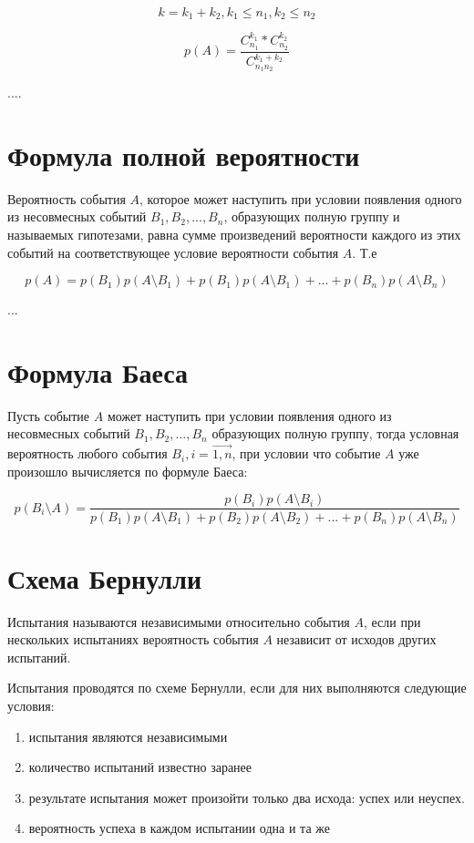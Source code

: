 \documentclass[a4paper]{article}
\begin{document}
$$ k = k_1 + k_2, k_1 \leq n_1, k_2 \leq n_2 $$

$$ p(A) = \frac{C_{n_1}^{k_1}*C_{n_2}^{k_2}}{C_{n_1n_2}^{k_1+k_2}}$$

....

\section{Формула полной вероятности}
Вероятность события $A$, которое может наступить при условии появления одного из несовмесных событий $B_1, B_2, ..., B_n$, образующих полную группу и называемых гипотезами,
равна сумме произведений вероятности каждого из этих событий на соответствующее условие вероятности события $A$. Т.е

$$ p(A) = p(B_1)p(A \setminus B_1) + p(B_1)p(A \setminus B_1) + ... + p(B_n)p(A \setminus B_n)$$

... 

\section{Формула Баеса}
Пусть событие $A$ может наступить при условии появления одного из несовмесных событий $B_1, B_2, ..., B_n$ образующих полную группу, тогда условная вероятность любого события $B_i, i=\vec{1,n}$,
при условии что событие $A$ уже произошло вычисляется по формуле Баеса:

$$ p(B_i \setminus A) = \frac{p(B_i)p(A \setminus B_i)}
                    {p(B_1)p(A \setminus B_1) + p(B_2)p(A \setminus B_2) + ... +  p(B_n)p(A \setminus B_n)}$$


\section{Схема Бернулли}

Испытания называются независимыми относительно события $A$, если при нескольких испытаниях вероятность события $A$ независит от исходов других испытаний.

Испытания проводятся по схеме Бернулли, если для них выполняются следующие условия: 

\begin{enumerate}
    \item испытания являются независимыми
    \item количество испытаний известно заранее
    \item результате испытания может произойти только два исхода: успех или неуспех. 
    \item вероятность успеха в каждом испытании одна и та же
\end{enumerate}
\end{document}
